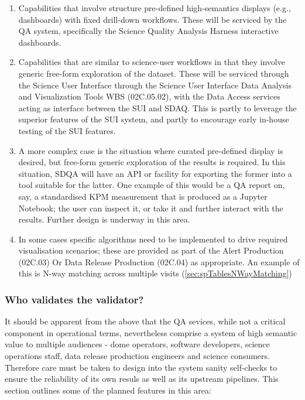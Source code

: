 \begin{enumerate}

\item Capabilities that involve structure pre-defined high-semantics displays (e.g., dashboards) with fixed drill-down workflows. These will be serviced by the QA system, specifically the Science Quality Analysis Harness interactive dashboards.

\item Capabilities that are similar to science-user workflows in that they involve generic free-form exploration of the dataset. These will be serviced through the Science User Interface through the Science User Interface Data Analysis and Visualization Tools WBS (02C.05.02), with the Data Access services acting as interface between the SUI and SDAQ. This is partly to leverage the superior features of the SUI system, and partly to encourage early in-house testing of the SUI features.

\item A more complex case is the situation where curated pre-defined display is desired, but free-form generic exploration of the results is required. In this situation, SDQA will have an API or facility for exporting the former into a tool suitable for the latter. One example of this would be a QA report on, say, a standardised KPM measurement that is produced as a Jupyter Notebook; the user can inspect it, or take it and further interact with the results. Further design is underway in this area.

\item In some cases specific algorithms need to be implemented to drive required visualisation scenarios; these are provided as part of the Alert Production (02C.03) Or Data Release Production (02C.04) as appropriate. An example of this is N-way matching across multiple visits (\ref{sec:spTablesNWayMatching})

\end{enumerate}

\subsubsection{Who validates the validator?}
\label{sec:qaSelfValidation}

It should be apparent from the above that the QA sevices, while not a critical component in operational terms, nevertheless comprise a system of high semantic value to multiple audiences - dome operators, software developers, science operations staff, data release production engineers and science consumers. Therefore care must be taken to design into the system sanity self-checks to ensure the reliability of its own resuls as well as its upstream pipelines. This section outlines some of the planned features in this area:

